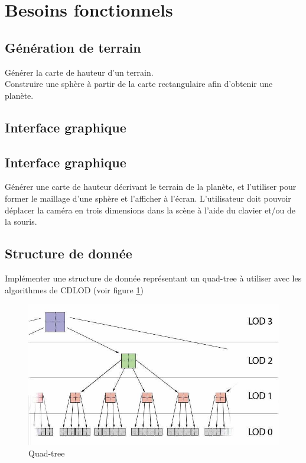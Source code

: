 \documentclass[12pt]{report}
\begin{document}


\section{Besoins fonctionnels}

\subsection{Génération de terrain}

Générer la carte de hauteur d'un terrain.\\
Construire une sphère à partir de la carte rectangulaire afin d'obtenir
une planète.


\subsection{Interface graphique}



\subsection{Interface graphique}

Générer une carte de hauteur décrivant le terrain de la planète, et l'utiliser pour former le maillage d'une sphère et l'afficher à l'écran. L'utilisateur doit pouvoir déplacer la caméra en trois dimensions dans la scène à l'aide du clavier et/ou de la souris.

\subsection{Structure de donnée}

Implémenter une structure de donnée représentant un quad-tree à utiliser avec les algorithmes de CDLOD (voir figure \ref{fig:quadtree})

\begin{figure}[!ht]
  \includegraphics[scale=0.5]{img/Quadtree.png}
  \caption{Quad-tree}
  \label{fig:quadtree}
\end{figure}
\end{document}
